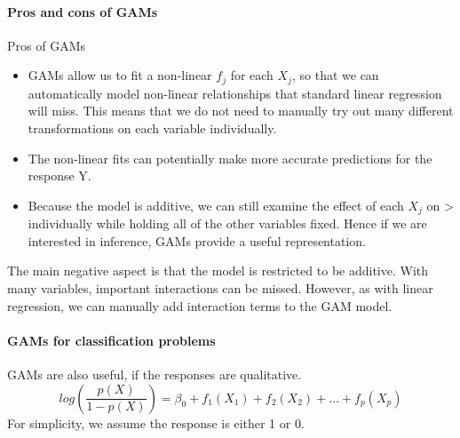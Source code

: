 \documentclass[../document.tex]{subfiles}
\begin{document}
	\paragraph{Pros and cons of GAMs}
	Pros of GAMs
	\begin{itemize}
		\item GAMs allow us to fit a non-linear \(f_{j}\) for each \(X_{j}\), so that we can automatically model non-linear relationships that standard linear regression will miss. This means that we do not need to manually try out many different transformations on each variable individually.
		\item The non-linear fits can potentially make more accurate predictions for the response Y.
		\item Because the model is additive, we can still examine the effect of each \(X_{j}\) on > individually while holding all of the other variables fixed. Hence if we are interested in inference, GAMs provide a useful representation.
	\end{itemize}
	The main negative aspect is that the model is restricted to be additive. With many variables, important interactions can be missed. However, as with linear regression, we can manually add interaction terms to the GAM model.

	\paragraph{GAMs for classification problems}
	GAMs are also useful, if the responses are qualitative.
	\begin{equation}
		log(\frac{p(X)}{1-p(X)})=\beta_{0}+f_{1}(X_{1})+f_{2}(X_{2})+...+f_{p}(X_{p})
	\end{equation}
	For simplicity, we assume the response is either 1 or 0.
\end{document}
